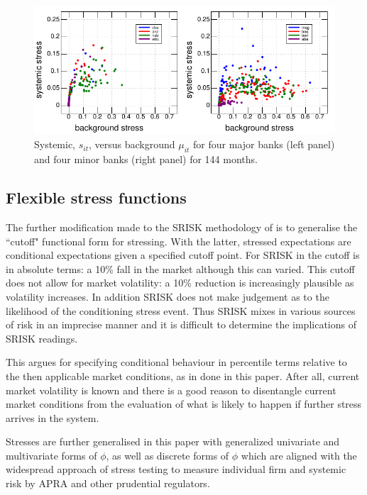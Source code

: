 \documentclass[12pt]{article}
\begin{document}
\begin{figure}[htbp]
\begin{center}
\includegraphics{figures/sysstress.pdf}
\caption{Systemic, $s_{it}$, versus background $\mu_{it}$   for four major banks (left panel) and four minor banks (right panel)  for 144 months.}
\label{sysstress}
\end{center}
\end{figure}


\subsection{Flexible  stress  functions}

The further modification made to the SRISK methodology of \cite{brownlees2015} is to generalise the ``cutoff" functional form for stressing.   With the latter, stressed expectations are conditional expectations given a specified cutoff point.  For SRISK in \cite{brownlees2015} the cutoff is in absolute terms:  a 10\% fall in the market although this can varied.   This cutoff does not allow for market volatility:   a 10\% reduction is  increasingly plausible as volatility increases.  In addition  SRISK does not  make judgement as to the likelihood of the conditioning stress event.   Thus SRISK mixes in various  sources of risk in an imprecise manner and it is difficult to determine the implications of SRISK readings.

This argues for specifying conditional behaviour in percentile terms relative to the then applicable market conditions, as in done in this paper.  After all, current market volatility is known and there is a good reason to disentangle current market conditions from the evaluation of what is likely to happen if further stress arrives in the system.

Stresses are further generalised in this paper with generalized univariate and multivariate forms of $\phi$, as well as discrete forms of $\phi$ which are aligned with the widespread approach of stress testing to measure individual firm and systemic risk by APRA and other prudential regulators.
\end{document}
